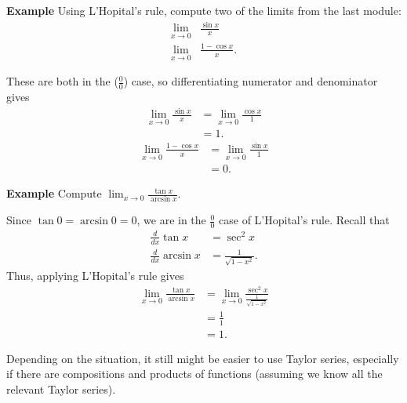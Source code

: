 \documentclass[twoside,openright,titlepage,a4paper]{book}
\begin{document}
\begin{sloppypar}
\textbf{Example} Using L'Hopital's rule, compute two of the limits from the last module:
\begin{align*}
\lim_{x \rightarrow 0} & \frac{\sin x}{x} \\
\lim_{x \rightarrow 0} & \frac{1-\cos x}{x}. 
\end{align*}
\begin{examplebox}
These are both in the ($\frac{0}{0}$) case, so differentiating numerator and denominator gives
\begin{align*}
\lim_{x \rightarrow 0} \frac{\sin x}{x} &= \lim_{x \rightarrow 0} \frac{\cos x}{1} \\
&= 1. 
\end{align*}
\begin{align*}
\lim_{x \rightarrow 0} \frac{1-\cos x}{x} &= \lim_{x \rightarrow 0} \frac{\sin x}{1} \\
&= 0.
\end{align*}
\end{examplebox}

\textbf{Example} Compute $\displaystyle \lim_{x \rightarrow 0} \frac{\tan x}{\arcsin x}$.
\begin{examplebox}
Since $\tan 0 = \arcsin 0 = 0$, we are in the $\frac{0}{0}$ case of L'Hopital's rule. Recall that
\begin{align*}
\frac{d}{dx} \tan x &= \sec^2 x \\
\frac{d}{dx} \arcsin x &= \frac{1}{\sqrt{1-x^2}}.
\end{align*}
Thus, applying L'Hopital's rule gives
\begin{align*}
\lim_{x \rightarrow 0} \frac{\tan x}{\arcsin x} &= \lim_{x \rightarrow 0} \frac{ \sec^2 x }{ \frac{1}{\sqrt{1-x^2}} } \\
&= \frac{1}{1} \\
&= 1.
\end{align*}
\end{examplebox}

Depending on the situation, it still might be easier to use Taylor series, especially if there are compositions and products of functions (assuming we know all the relevant Taylor series).


\end{sloppypar}
\end{document}
